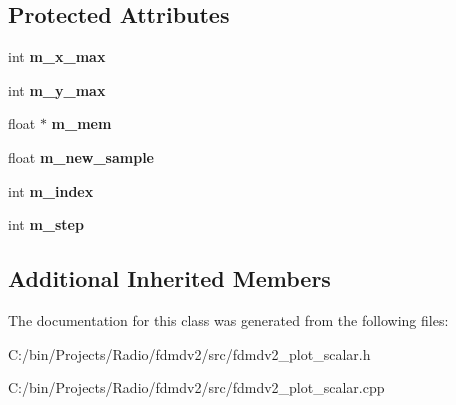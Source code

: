 \subsection*{Protected Attributes}
\begin{DoxyCompactItemize}
\item 
\hypertarget{class_plot_scalar_a9a9edfbd8517f1ce1e7b75bcd4fda4f5}{int {\bfseries m\-\_\-x\-\_\-max}}\label{class_plot_scalar_a9a9edfbd8517f1ce1e7b75bcd4fda4f5}

\item 
\hypertarget{class_plot_scalar_a91ce24595550dd2c4add253025ba668c}{int {\bfseries m\-\_\-y\-\_\-max}}\label{class_plot_scalar_a91ce24595550dd2c4add253025ba668c}

\item 
\hypertarget{class_plot_scalar_a28e4e09d513bce7b2890635d1ed1967d}{float $\ast$ {\bfseries m\-\_\-mem}}\label{class_plot_scalar_a28e4e09d513bce7b2890635d1ed1967d}

\item 
\hypertarget{class_plot_scalar_a963d1a8e34175f7d3b1f82fa4e71ae19}{float {\bfseries m\-\_\-new\-\_\-sample}}\label{class_plot_scalar_a963d1a8e34175f7d3b1f82fa4e71ae19}

\item 
\hypertarget{class_plot_scalar_a3ff0dec7b8f50b3ca7155c06e8877ab5}{int {\bfseries m\-\_\-index}}\label{class_plot_scalar_a3ff0dec7b8f50b3ca7155c06e8877ab5}

\item 
\hypertarget{class_plot_scalar_a8e057f0175729eea2a6e8ec5597bb1c0}{int {\bfseries m\-\_\-step}}\label{class_plot_scalar_a8e057f0175729eea2a6e8ec5597bb1c0}

\end{DoxyCompactItemize}
\subsection*{Additional Inherited Members}


The documentation for this class was generated from the following files\-:\begin{DoxyCompactItemize}
\item 
C\-:/bin/\-Projects/\-Radio/fdmdv2/src/fdmdv2\-\_\-plot\-\_\-scalar.\-h\item 
C\-:/bin/\-Projects/\-Radio/fdmdv2/src/fdmdv2\-\_\-plot\-\_\-scalar.\-cpp\end{DoxyCompactItemize}
